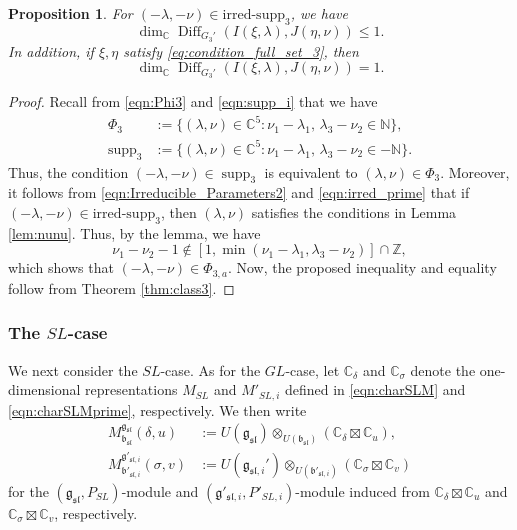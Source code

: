 \documentclass[a4paper,11pt,reqno]{amsart}
\newcommand{\frakg}{\mathfrak{g}}
\newcommand{\0}{{\bf 0}}
\newcommand{\N}{\mathbb{N}}
\newcommand{\Z}{\mathbb{Z}}
\newcommand{\C}{\mathbb{C}}
\newcommand{\1}{{\bf 1}}
\newcommand{\frakb}{{\mathfrak b}}
\newcommand{\irredsupp}{\mathrm{irred\text{-}supp}}
\DeclareMathOperator{\supp}{supp}
\DeclareMathOperator{\Diff}{Diff}
\newcommand{\fraksl}{{\mathfrak{sl}}}
\newcommand{\Mbsl}{M^{\frakg_{\fraksl}}_{\frakb_{\fraksl}}}
\theoremstyle{plain}
\newtheorem{proposition}[equation]{Proposition}
\theoremstyle{definition}
\numberwithin{equation}{section}
\theoremstyle{definition}
\begin{document}
\begin{proposition}
For $(-\lambda, -\nu) \in \irredsupp_3$, we have 
\begin{equation*}
\dim_\C\Diff_{G_3'}(I(\xi, \lambda), J(\eta,\nu)) \leq 1.
\end{equation*}
In addition, if $\xi, \eta$ satisfy \eqref{eq:condition_full_set_3}, then 
\begin{equation*}
\dim_\C\Diff_{G_3'}(I(\xi, \lambda), J(\eta,\nu)) =1.
\end{equation*}
\end{proposition}

\begin{proof}
Recall from \eqref{eqn:Phi3} and \eqref{eqn:supp_i} that we have 
\begin{align*}
\Phi_{3}&:= \{(\lambda, \nu) \in \C^5: \nu_1-\lambda_1,\, \lambda_3-\nu_2 \in \N\},\\
\supp_{3} &:= \{(\lambda, \nu) \in \C^5: \nu_1-\lambda_1,\, \lambda_3-\nu_2 \in -\N\}.
\end{align*}
Thus, the condition $(-\lambda, -\nu) \in \supp_{3}$ is equivalent to
$(\lambda, \nu) \in \Phi_{3}$. 
Moreover, it follows from
\eqref{eqn:Irreducible_Parameters2} and
 \eqref{eqn:irred_prime} that 
if $(-\lambda, -\nu) \in \irredsupp_3$,
then $(\lambda,\nu)$ satisfies the conditions in Lemma \ref{lem:nunu}.
Thus, by the lemma, we have 
\begin{equation*}
\nu_1-\nu_2-1 \notin [1, \min(\nu_1-\lambda_1,\lambda_3-\nu_2)]\cap \Z,
\end{equation*}
which shows that $(-\lambda,-\nu) \in \Phi_{3,a}$.
Now, the proposed inequality and equality follow from Theorem \ref{thm:class3}.
\end{proof}




\subsubsection{The \texorpdfstring{$SL$}{SL}-case}
\label{sec:BranchingDSBO_SL}

We next consider the $SL$-case.
As for the $GL$-case, let 
$\C_{\delta}$ and $\C_{\sigma}$ denote the 
one-dimensional representations $M_{SL}$ and $M'_{SL,i}$
defined in \eqref{eqn:charSLM}
and
\eqref{eqn:charSLMprime}, 
respectively.
We then write
\begin{align*}
\Mbsl(\delta,u)
&:=U(\frakg_{\fraksl})\otimes_{U(\frakb_{\fraksl})}(\C_{\delta}\boxtimes \C_{u}),\\[3pt]
M^{\frakg'_{\fraksl,i}}_{\frakb'_{\fraksl,i}}(\sigma,v)
&:=U(\frakg_{\fraksl,i}')\otimes_{U(\frakb'_{\fraksl,i})}(\C_{\sigma}\boxtimes \C_{v})
\end{align*}
for the $(\frakg_{\fraksl},P_{SL})$-module and 
$(\frakg'_{\fraksl, i},P'_{SL,i})$-module induced from 
$\C_{\delta}\boxtimes \C_{u}$ and 
$\C_{\sigma}\boxtimes \C_{v}$, respectively.
\end{document}
